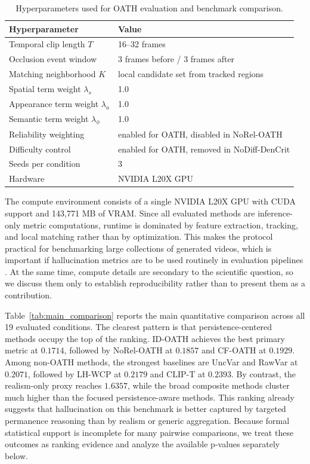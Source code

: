 \documentclass{article}
\begin{document}
\begin{table}[htbp]
    \centering
    \caption{Hyperparameters used for OATH evaluation and benchmark comparison.}
    \label{tab:hyperparameters}
    \begin{tabular}{ll}
        \toprule
        Hyperparameter & Value \\
        \midrule
        Temporal clip length \(T\) & 16--32 frames \\
        Occlusion event window & 3 frames before / 3 frames after \\
        Matching neighborhood \(K\) & local candidate set from tracked regions \\
        Spatial term weight \(\lambda_s\) & 1.0 \\
        Appearance term weight \(\lambda_a\) & 1.0 \\
        Semantic term weight \(\lambda_\phi\) & 1.0 \\
        Reliability weighting & enabled for OATH, disabled in NoRel-OATH \\
        Difficulty control & enabled for OATH, removed in NoDiff-DenCrit \\
        Seeds per condition & 3 \\
        Hardware & NVIDIA L20X GPU \\
        \bottomrule
    \end{tabular}
\end{table}

The compute environment consists of a single NVIDIA L20X GPU with CUDA support and 143,771 MB of VRAM. Since all evaluated methods are inference-only metric computations, runtime is dominated by feature extraction, tracking, and local matching rather than by optimization. This makes the protocol practical for benchmarking large collections of generated videos, which is important if hallucination metrics are to be used routinely in evaluation pipelines \cite{vbench2024,videoscore2024}. At the same time, compute details are secondary to the scientific question, so we discuss them only to establish reproducibility rather than to present them as a contribution.

Table~\ref{tab:main_comparison} reports the main quantitative comparison across all 19 evaluated conditions. The clearest pattern is that persistence-centered methods occupy the top of the ranking. ID-OATH achieves the best primary metric at \(0.1714\), followed by NoRel-OATH at \(0.1857\) and CF-OATH at \(0.1929\). Among non-OATH methods, the strongest baselines are UncVar and RawVar at \(0.2071\), followed by LH-WCP at \(0.2179\) and CLIP-T at \(0.2393\). By contrast, the realism-only proxy reaches \(1.6357\), while the broad composite methods cluster much higher than the focused persistence-aware methods. This ranking already suggests that hallucination on this benchmark is better captured by targeted permanence reasoning than by realism or generic aggregation. Because formal statistical support is incomplete for many pairwise comparisons, we treat these outcomes as ranking evidence and analyze the available p-values separately below.
\end{document}
